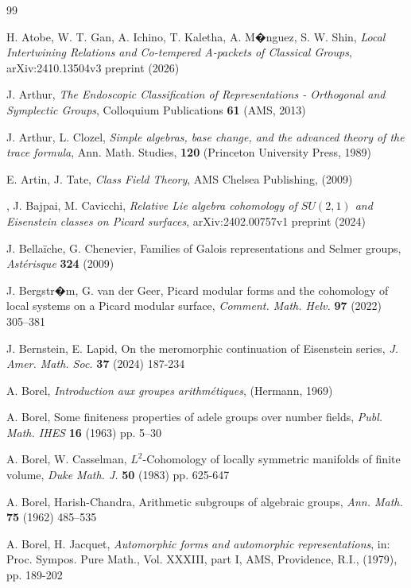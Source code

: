 \documentclass[a4paper,10pt]{amsart}
\theoremstyle{definition}
\numberwithin{equation}{section}
\begin{document}
\begin{thebibliography}{99}

 H. Atobe, W. T. Gan, A. Ichino, T. Kaletha, A. M�nguez, S. W. Shin, {\it Local Intertwining Relations and Co-tempered A-packets of Classical Groups}, arXiv:2410.13504v3 preprint (2026)


 J. Arthur, {\it The Endoscopic Classification of Representations - Orthogonal and Symplectic Groups}, Colloquium Publications {\bf 61} (AMS, 2013)

 J. Arthur, L. Clozel, {\it Simple algebras, base change, and the advanced theory of the trace formula}, Ann. Math. Studies, {\bf 120} (Princeton University Press, 1989)

 E. Artin, J. Tate, \emph{Class Field Theory}, AMS Chelsea Publishing, (2009)

, J. Bajpai, M. Cavicchi, {\it Relative Lie algebra cohomology of $SU(2,1)$ and Eisenstein classes on Picard surfaces}, arXiv:2402.00757v1 preprint (2024)

 J. Bella\"iche, G. Chenevier, Families of Galois representations and Selmer groups, {\it Ast\'erisque} {\bf 324} (2009)

 J. Bergstr�m, G. van der Geer, Picard modular forms and the cohomology of local systems on a Picard modular surface, {\it Comment. Math. Helv.} {\bf 97} (2022) 305--381

 J. Bernstein, E. Lapid, On the meromorphic continuation of Eisenstein series, {\it J. Amer. Math. Soc.} {\bf 37} (2024) 187-234

 A. Borel, {\it Introduction aux groupes arithm\'etiques}, (Hermann, 1969)

 A. Borel, Some finiteness properties of adele groups over number fields, {\it Publ. Math. IHES} {\bf 16} (1963) pp. 5--30

 A. Borel, W. Casselman, $L^2$-Cohomology of locally symmetric manifolds of finite volume, {\it Duke Math. J.} \textbf{50} (1983) pp. 625-647

 A. Borel, Harish-Chandra, Arithmetic subgroups of algebraic groups, {\it Ann. Math.} {\bf 75} (1962) 485--535

 A. Borel, H. Jacquet, {\it Automorphic forms and automorphic representations}, in: Proc. Sympos. Pure Math., Vol. XXXIII, part I, AMS, Providence, R.I., (1979), pp. 189-202


\end{thebibliography}
\end{document}
